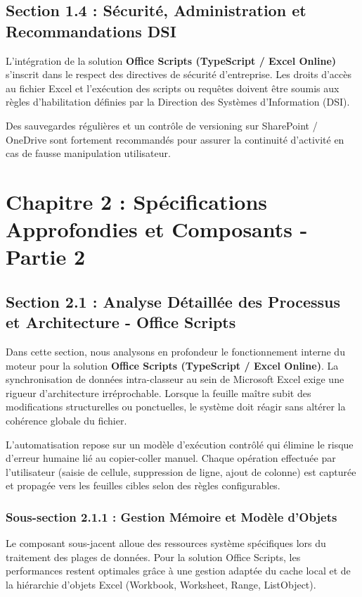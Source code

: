 \documentclass[12pt,a4paper]{report}
\begin{document}
\section{Section 1.4 : Sécurité, Administration et Recommandations DSI}
L'intégration de la solution \textbf{Office Scripts (TypeScript / Excel Online)} s'inscrit dans le respect des directives de sécurité d'entreprise. Les droits d'accès au fichier Excel et l'exécution des scripts ou requêtes doivent être soumis aux règles d'habilitation définies par la Direction des Systèmes d'Information (DSI).

Des sauvegardes régulières et un contrôle de versioning sur SharePoint / OneDrive sont fortement recommandés pour assurer la continuité d'activité en cas de fausse manipulation utilisateur.


\chapter{Chapitre 2 : Spécifications Approfondies et Composants - Partie 2}

\section{Section 2.1 : Analyse Détaillée des Processus et Architecture - Office Scripts}
Dans cette section, nous analysons en profondeur le fonctionnement interne du moteur pour la solution \textbf{Office Scripts (TypeScript / Excel Online)}. La synchronisation de données intra-classeur au sein de Microsoft Excel exige une rigueur d'architecture irréprochable. Lorsque la feuille maître subit des modifications structurelles ou ponctuelles, le système doit réagir sans altérer la cohérence globale du fichier.

L'automatisation repose sur un modèle d'exécution contrôlé qui élimine le risque d'erreur humaine lié au copier-coller manuel. Chaque opération effectuée par l'utilisateur (saisie de cellule, suppression de ligne, ajout de colonne) est capturée et propagée vers les feuilles cibles selon des règles configurables.


\subsection{Sous-section 2.1.1 : Gestion Mémoire et Modèle d'Objets}
Le composant sous-jacent alloue des ressources système spécifiques lors du traitement des plages de données. Pour la solution Office Scripts, les performances restent optimales grâce à une gestion adaptée du cache local et de la hiérarchie d'objets Excel (Workbook, Worksheet, Range, ListObject).
\end{document}

